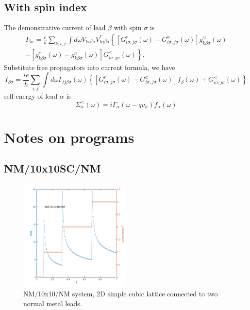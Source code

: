 \documentclass[11pt,a4paper]{article}
\begin{document}
\subsection{With spin index}
The demonstrative current of lead $\beta$ with spin $\sigma$ is~\cite{CaoZhan}
\begin{equation}
\begin{array}{r}
I_{\beta \sigma}=\frac{e}{h} \sum_{k, i, j} \int d \omega V_{k i \beta \sigma} V_{k j \beta \sigma}^{*}\left\{\left[G_{i \sigma, j \sigma}^{r}(\omega)-G_{i \sigma, j \sigma}^{a}(\omega)\right] g_{k \beta \sigma}^{<}(\omega)\right. \\
\left.-\left[g_{k \beta \sigma}^{r}(\omega)-g_{k \beta \sigma}^{a}(\omega)\right] G_{i \sigma, j \sigma}^{<}(\omega)\right\}.
\end{array}
\end{equation}
Substitute free propagators into current formula, we have
\begin{equation}
I_{\beta \sigma}=\frac{i e}{h} \sum_{i, j} \int d \omega \Gamma_{i j \beta \sigma}(\omega)\left\{\left[G_{i \sigma, j \sigma}^{r}(\omega)-G_{i \sigma, j \sigma}^{a}(\omega)\right] f_{\beta}(\omega)+G_{i \sigma, j \sigma}^{<}(\omega)\right\}
\end{equation}
self-energy of lead $\alpha$ is
\begin{equation}
\Sigma_{\alpha}^{<}(\omega)=i \Gamma_{\alpha}\left(\omega-q v_{\alpha}\right) f_{\alpha}(\omega)
\end{equation}
\section{Notes on programs}
\subsection{NM/10x10SC/NM}
\begin{figure}[htp!]
\centering
\includegraphics[width=0.5\textwidth, height=0.4\textwidth]{figures/DOST-E.pdf}
\caption{NM/10x10/NM system, 2D simple cubic lattice connected to two normal metal leads.}
\end{figure}
\end{document}
